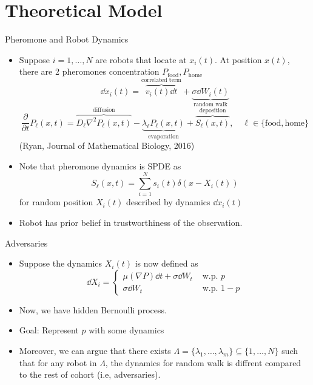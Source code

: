 \documentclass[10pt]{beamer}
\begin{document}
\section{Theoretical Model}
\begin{frame}{Pheromone and Robot Dynamics}
\begin{itemize}
    \item Suppose $i=1,\dots,N$ are robots that locate at $x_i(t)$. At position $x(t)$, there are 2 pheromones concentration $P_\text{food},P_{\text{home}}$
    \[
    \dd x_i(t) = \overbrace{v_i(t) \dd t}^\text{correlated term} + \underbrace{\sigma \dd W_i(t)}_{\text{random walk}}
    \]
    \[
    \dfrac{\partial}{\partial t} P_\ell(x,t) = \overbrace{D_\ell \nabla^2P_\ell(x,t)}^{\text{diffusion}} - \underbrace{\lambda_\ell P_\ell(x,t)}_{\text{evaporation}} +\overbrace{S_\ell(x,t)}^{\text{deposition}}, \quad \ell\in\{\text{food},\text{home}\}
    \] (Ryan, Journal of Mathematical Biology, 2016)
    \item Note that pheromone dynamics is SPDE as \[S_\ell(x,t) = \sum_{i=1}^N s_i(t)\delta(x-X_i(t))\] for random position $X_i(t)$ described by dynamics $\dd x_i(t)$
    \item Robot has prior belief in trustworthiness of the observation.
\end{itemize}
\end{frame}
	\begin{frame}{Adversaries}
		\begin{itemize}
			\item Suppose the dynamics $X_i(t)$ is now defined as
				\[
				\dd X_i = \begin{cases}
				\mu(\nabla P) \dd t + \sigma \dd W_t & \text{ w.p. } p\\
				\sigma \dd W_t & \text{ w.p. } 1-p
				\end{cases}
				\]
			\item Now, we have hidden Bernoulli process.
      \item Goal: Represent $p$ with some dynamics
      \item Moreover, we can argue that there exists $\Lambda = \{\lambda_1,\dots,\lambda_m\}\subseteq \{1,\dots,N\}$ such that for any robot in $\Lambda$, the dynamics for random walk is diffrent compared to the rest of cohort (i.e, adversaries).

		\end{itemize}
	\end{frame}
\end{document}
